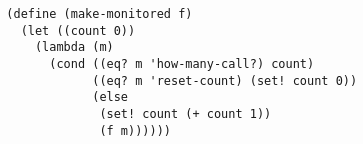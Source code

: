 \documentclass[a4paper,12pt]{article}
\begin{document}
\begin{lstlisting}
  (define (make-monitored f)
    (let ((count 0))
      (lambda (m)
        (cond ((eq? m 'how-many-call?) count)
              ((eq? m 'reset-count) (set! count 0))
              (else
               (set! count (+ count 1))
               (f m))))))
\end{lstlisting}
\end{document}
